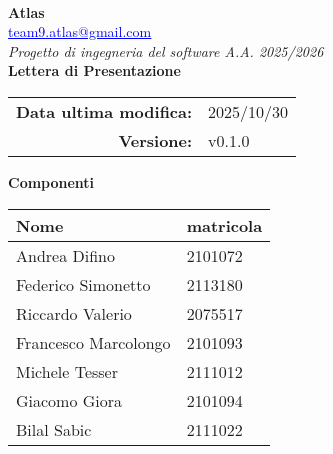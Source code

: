 \documentclass[a4paper,12pt]{article}
\makeatletter
\newcommand{\Gruppo}{Atlas}
\newcommand{\Email}{\href{mailto:team9.atlas@gmail.com}{\textcolor{blue}{\underline{team9.atlas@gmail.com}}}}
\newcommand{\TitoloUno}{Lettera di Presentazione}
\newcommand{\DataModifica}{2025/10/30}
\newcommand{\LogoGruppo}{img/AtlasLogo.png} %
\newcommand{\VersioneDocumento}{v0.1.0} %
\makeatother
\begin{document}
\begin{titlepage}
    \centering

    \vspace*{0cm}
    \\[0.8cm]

    {\LARGE \textbf{\Gruppo}}\\[0.1cm]
    {\large \Email}\\[1.2cm]

    {\Large \textit{Progetto di ingegneria del software A.A. 2025/2026}}\\[1.5cm]

    {\Huge \textbf{\TitoloUno}}\\[.5cm]

    \begin{tabular}{rl}
        \textbf{Data ultima modifica:} & \DataModifica \\
        \textbf{Versione:} & \VersioneDocumento \\
    \end{tabular}

    \hspace{1cm}

     {\large \textbf{Componenti}}\\[0.5cm]
    \begin{tabular}{l|l}
        \textbf{Nome} & \textbf{matricola} \\
        \hline
        Andrea Difino & 2101072 \\
        Federico Simonetto & 2113180 \\
        Riccardo Valerio & 2075517 \\
        Francesco Marcolongo & 2101093 \\
        Michele Tesser & 2111012 \\
        Giacomo Giora & 2101094 \\
        Bilal Sabic & 2111022 \\
    \end{tabular}

\end{titlepage}
\end{document}
